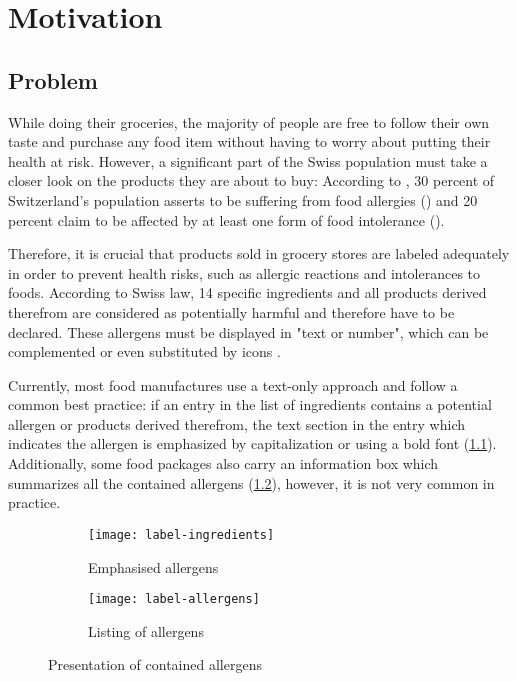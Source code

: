 \chapter{Motivation}
\label{chap:motiviation}
\thispagestyle{fancy}

\section{Problem}
\label{sec:problem}

While doing their groceries, the majority of people are free to follow their own taste and purchase any food item without having to worry about putting their health at risk. However, a significant part of the Swiss population must take a closer look on the products they are about to buy: According to \citeauthor{AhaAllergies}, 30 percent of Switzerland's population asserts to be suffering from food allergies (\citeyear{AhaAllergies}) and 20 percent claim to be affected by at least one form of food intolerance (\citeyear{AhaIntolerances}).

Therefore, it is crucial that products sold in grocery stores are labeled adequately in order to prevent health risks, such as allergic reactions and intolerances to foods. According to Swiss law, 14 specific ingredients and all products derived therefrom are considered as potentially harmful and therefore have to be declared. These allergens must be displayed in "text or number", which can be complemented or even substituted by icons \citep{FoodLaw}.

Currently, most food manufactures use a text-only approach and follow a common best practice: if an entry in the list of ingredients contains a potential allergen or products derived therefrom, the text section in the entry which indicates the allergen is emphasized by capitalization or using a bold font (\cref{fig:label-ingredients}). Additionally, some food packages also carry an information box which summarizes all the contained allergens (\cref{fig:label-allergens}), however, it is not very common in practice.

\begin{figure}[ht]
     \centering
     
     \begin{subfigure}[b]{0.5\textwidth}
         \centering
         \texttt{[image: label-ingredients]}
         \caption{Emphasised allergens}
         \label{fig:label-ingredients}
     \end{subfigure}
          \hfill
     \begin{subfigure}[b]{0.4\textwidth}
         \centering
         \texttt{[image: label-allergens]}
         \caption{Listing of allergens}
         \label{fig:label-allergens}
     \end{subfigure}
        \caption{Presentation of contained allergens}
        \label{fig:labels}
\end{figure}


